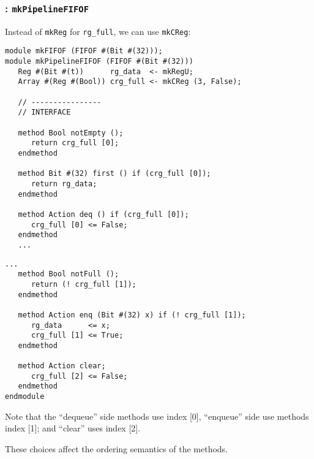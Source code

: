 \begin{frame}[fragile]
\frametitle{{\BSV}: {\tt mkPipelineFIFOF}}

\label{mkPipelineFIFOF}

\footnotesize

Instead of {\tt mkReg} for {\tt rg\_full}, we can use {\tt mkCReg}:

\begin{center}
\begin{minipage}[t]{0.485\textwidth}\scriptsize
\begin{Verbatim}[frame=single]
module mkFIFOF (FIFOF #(Bit #(32)));
module mkPipelineFIFOF (FIFOF #(Bit #(32)))
   Reg #(Bit #(t))      rg_data  <- mkRegU;
   Array #(Reg #(Bool)) crg_full <- mkCReg (3, False);

   // ----------------
   // INTERFACE

   method Bool notEmpty ();
      return crg_full [0];
   endmethod

   method Bit #(32) first () if (crg_full [0]);
      return rg_data;
   endmethod

   method Action deq () if (crg_full [0]);
      crg_full [0] <= False;
   endmethod
   ...
\end{Verbatim}
\end{minipage}
\begin{minipage}[t]{0.485\textwidth}\scriptsize
\begin{Verbatim}[frame=single]
   ...
   method Bool notFull ();
      return (! crg_full [1]);
   endmethod

   method Action enq (Bit #(32) x) if (! crg_full [1]);
      rg_data      <= x;
      crg_full [1] <= True;
   endmethod

   method Action clear;
      crg_full [2] <= False;
   endmethod
endmodule
\end{Verbatim}

\vspace{1ex}

Note that the ``dequeue'' side methods use index [0], ``enqueue'' side
use methods index [1]; and ``clear'' uses index [2].

\vspace{1ex}

These choices affect the ordering semantics of the methods.

\end{minipage}
\end{center}

\end{frame}

